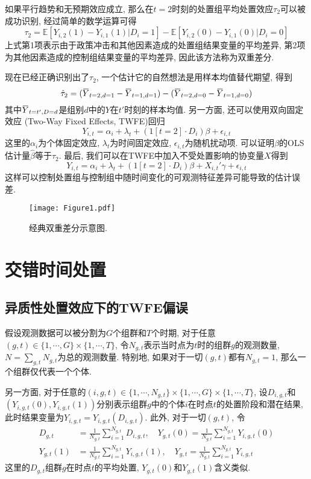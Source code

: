 \documentclass[cn,blue,14pt,screen,bibstyle=gb7714-2015]{elegantnote}
\newcommand{\E}{\mathbb{E}}
\newcommand{\overbar}[1]{\mkern 1.5mu\overline{\mkern-1.5mu#1\mkern-1.5mu}\mkern 1.5mu}
\begin{document}
如果平行趋势和无预期效应成立, 那么在$t=2$时刻的处置组平均处置效应$\tau_2$可以被成功识别, 经过简单的数学运算可得
$$\tau_2=\E[Y_{i,2}(1)-Y_{i,1}(1)|D_i=1]-\E[Y_{i,2}(0)-Y_{i,1}(0)|D_i=0]$$
上式第1项表示由于政策冲击和其他因素造成的处置组结果变量的平均差异, 第2项为其他因素造成的控制组结果变量的平均差异, 因此该方法称为双重差分.

现在已经正确识别出了$\tau_2$, 一个估计它的自然想法是用样本均值替代期望, 得到
$$\hat{\tau}_2=(\overbar{Y}_{t=2,d=1}-\overbar{Y}_{t=1,d=1})-(\overbar{Y}_{t=2,d=0}-\overbar{Y}_{t=1,d=0})$$
其中$\overbar{Y}_{t=t',D=d}$是组别$d$中的$Y$在$t'$时刻的样本均值. 另一方面, 还可以使用双向固定效应 (Two-Way Fixed Effects, TWFE)回归
$$Y_{i,t}=\alpha_i+\lambda_t+(1[t=2]\cdot D_i)\beta+\epsilon_{i,t}$$
这里的$\alpha_i$为个体固定效应, $\lambda_t$为时间固定效应, $\epsilon_{i,t}$为随机扰动项. 可以证明$\beta$的OLS估计量$\hat{\beta}$等于$\hat{\tau}_2$. 最后, 我们可以在TWFE中加入不受处置影响的协变量$X$得到
$$Y_{i,t}=\alpha_i+\lambda_t+(1[t=2]\cdot D_i)\beta+{X}_{i,t}'\gamma+\epsilon_{i,t}$$
这样可以控制处置组与控制组中随时间变化的可观测特征差异可能导致的估计误差.

\begin{figure}
  \centering
  \texttt{[image: Figure1.pdf]}
  \caption{经典双重差分示意图.}
\end{figure}
\newpage
\section{交错时间处置}
\subsection{异质性处置效应下的TWFE偏误}
假设观测数据可以被分割为$G$个组群和$T$个时期, 对于任意$(g,t)\in \{1,\cdots,G\}\times\{1,\cdots,T\}$, 令$N_{g,t}$表示当时点为$t$时的组群$g$的观测数量, $N=\sum_{g,t}N_{g,t}$为总的观测数量. 特别地, 如果对于一切$(g,t)$都有$N_{g,t}=1$, 那么一个组群仅代表一个个体.

另一方面, 对于任意的$(i,g,t)\in\{1,\cdots,N_{g,t}\}\times\{1,\cdots,G\}\times\{1,\cdots,T\}$, 设$D_{i,g,t}$和$(Y_{i,g,t}(0),Y_{i,g,t}(1))$分别表示组群$g$中的个体$i$在时点$t$的处置阶段和潜在结果, 此时结果变量为$Y_{i,g,t}=Y_{i,g,t}(D_{i,g,t})$. 此外, 对于一切$(g,t)$, 令
\begin{align*}
D_{g,t}&=\frac{1}{N_{g,t}}\sum_{i=1}^{N_{g,t}}D_{i,g,t},\quad Y_{g,t}(0)=\frac{1}{N_{g,t}}\sum_{i=1}^{N_{g,t}}Y_{i,g,t}(0) \\
Y_{g,t}(1)&=\frac{1}{N_{g,t}}\sum_{i=1}^{N_{g,t}}Y_{i,g,t}(1),\quad Y_{g,t}=\frac{1}{N_{g,t}}\sum_{i=1}^{N_{g,t}}Y_{i,g,t}
\end{align*}
这里的$D_{g,t}$组群$g$在时点$t$的平均处置, $Y_{g,t}(0)$和$Y_{g,t}(1)$含义类似.
\end{document}
